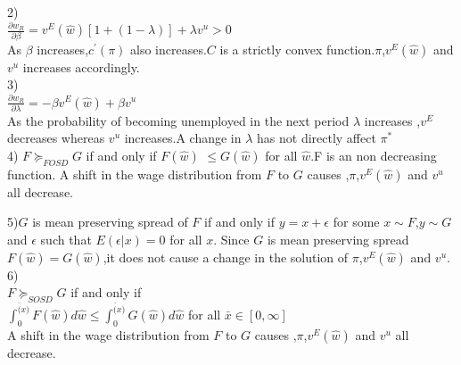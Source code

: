 \documentclass[11pt]{article}
\begin{document}
2)\\

$\frac{\partial w_{R}}{\partial \beta}=v^{E}(\hat{w})[1+(1-\lambda)]+\lambda v^{u}  
>0$\\



As $\beta$ increases,$c^{\prime}(\pi)$ also increases.$C$ is a strictly convex 
function.$\pi$,$v^{E}(\hat{w})$ and $v^{u}$ increases accordingly.\\

3)\\
$\frac{\partial w_{R}}{\partial \lambda}=-\beta v^{E}(\hat{w})+\beta v^{u}$\\

As the probability of becoming unemployed in the next period $\lambda$ increases ,$v^{E}$ decreases 
 whereas $v^{u}$ increases.A change in $\lambda$ has not directly  affect $\pi^{*}$\\

4) 
$F \succeq_{FOSD} G $ if and only if $F(\hat{w}) $ $\leq G(\hat{w})$ for all $\hat{w}$.F is an 
non decreasing function.
A shift in the wage distribution from $F$ to $G$  causes ,$\pi$,$v^{E}(\hat{w})$ and $v^{u}$ 
all decrease.

5)$G$ is mean preserving spread of $F$ if and only if $y=x+\epsilon$ for some $x\sim 
F$,$y\sim G$ and $\epsilon$ such that $E(\epsilon|x)=0$ for all $x$.
Since $G$ is mean preserving spread$F(\hat{w})=G(\hat{w})$,it does not cause a change in the solution 
of $\pi$,$v^{E}(\hat{w})$ and $v^{u}$.\\

6)\\
$F \succeq_{SOSD} G $ if and only if\\

$\int_{0}^{\bar(x)}F(\hat{w})d\hat{w} \leq \int_{0}^{\bar(x)}G(\hat{w})d\hat{w} $ 
for all $\bar{x} \in [0,\infty]$\\

A shift in the wage distribution from $F$ to $G$  causes ,$\pi$,$v^{E}(\hat{w})$ and $v^{u}$ 
all decrease.
\end{document}
